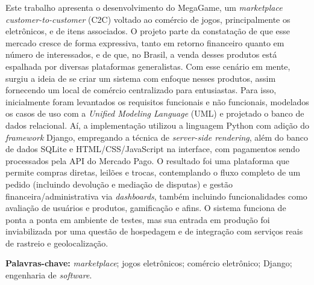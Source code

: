 \documentclass[
  12pt,
  a4paper,
  oneside,
  chapter=TITLE,
  subsection=TITLE,
  sumario=abnt-6027-2012,
  english,
  brazil
]{abntex2}
\begin{document}
\begin{resumo}
Este trabalho apresenta o desenvolvimento do MegaGame, um
\emph{marketplace} \emph{customer-to-customer} (C2C) voltado ao comércio
de jogos, principalmente os eletrônicos, e de itens associados. O
projeto parte da constatação de que esse mercado cresce de forma
expressiva, tanto em retorno financeiro quanto em número de
interessados, e de que, no Brasil, a venda desses produtos está
espalhada por diversas plataformas generalistas. Com esse cenário em mente, surgiu a ideia
de se criar um sistema com enfoque nesses produtos, assim fornecendo
um local de comércio centralizado para entusiastas. Para isso, inicialmente foram levantados os requisitos
funcionais e não funcionais, modelados os casos de uso com a \emph{Unified Modeling Language} (UML) e
projetado o banco de dados relacional. Aí, a implementação utilizou a linguagem
Python com adição do \emph{framework} Django, empregando a técnica de \emph{server-side rendering}, além do
banco de dados SQLite e HTML/CSS/JavaScript na interface, com pagamentos sendo processados pela API
do Mercado Pago. O resultado foi uma plataforma que permite compras diretas, leilões e trocas,
contemplando o fluxo completo de um pedido (incluindo devolução e mediação de disputas) e gestão
financeira/administrativa via \emph{dashboards}, também incluindo funcionalidades
como avaliação de usuários e produtos, gamificação e afins. O sistema
funciona de ponta a ponta em ambiente de testes, mas sua entrada em produção
foi inviabilizada por uma questão de hospedagem e de integração com serviços reais
de rastreio e geolocalização.

\vspace{\onelineskip}
\noindent\textbf{Palavras-chave:} \emph{marketplace}; jogos eletrônicos; comércio eletrônico; Django; engenharia de \emph{software}.
\end{resumo}
\end{document}
